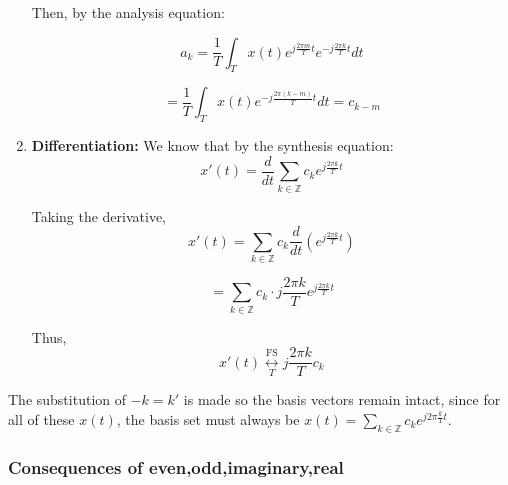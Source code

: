 \begin{derivation}
\begin{enumerate}
            Then, by the analysis equation:
            
            \[
            a_k = \frac{1}{T} \int_T x(t) e^{j\frac{2\pi m}{T}t} e^{-j\frac{2\pi k}{T}t} dt
            \]
            
            \[
            = \frac{1}{T} \int_T x(t) e^{-j\frac{2\pi (k - m)}{T}t} dt = c_{k-m}
            \]
        
        \item \textbf{Differentiation:} We know that by the synthesis equation:
        \[
        x'(t) = \frac{d}{dt} \sum_{k \in \mathbb{Z}} c_k e^{j\frac{2\pi k}{T}t}
        \]
        
        Taking the derivative,
        \[
        x'(t) = \sum_{k \in \mathbb{Z}} c_k \frac{d}{dt} \left( e^{j\frac{2\pi k}{T}t} \right)
        \]
        
        \[
        = \sum_{k \in \mathbb{Z}} c_k \cdot j\frac{2\pi k}{T} e^{j\frac{2\pi k}{T}t}
        \]
        
        Thus,
        \[
        x'(t) \underset{T}{\overset{\text{FS}}{\longleftrightarrow}} j\frac{2\pi k}{T} c_k
        \]
    \end{enumerate}
\end{derivation}

\begin{warning}
    The substitution of $-k=k'$ is made so the basis vectors remain intact, since for all of these $x(t)$, the basis set must always be $x(t) = \sum_{k \in \mathbb{Z}} c_k e^{j 2\pi \frac{k}{T} t}$.
\end{warning}

\subsubsection{Consequences of even,odd,imaginary,real}

